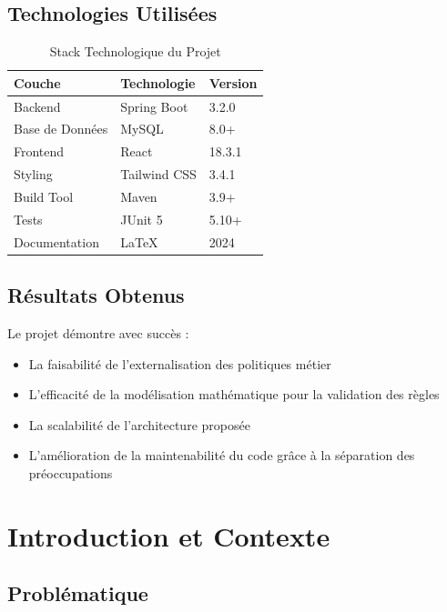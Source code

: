 \documentclass[12pt,a4paper]{article}
\begin{document}
    \subsection{Technologies Utilisées}

    \begin{table}[H]
        \centering
        \begin{tabular}{|l|l|l|}
            \hline
            \textbf{Couche} & \textbf{Technologie} & \textbf{Version} \\
            \hline
            Backend & Spring Boot & 3.2.0 \\
            Base de Données & MySQL & 8.0+ \\
            Frontend & React & 18.3.1 \\
            Styling & Tailwind CSS & 3.4.1 \\
            Build Tool & Maven & 3.9+ \\
            Tests & JUnit 5 & 5.10+ \\
            Documentation & LaTeX & 2024 \\
            \hline
        \end{tabular}
        \caption{Stack Technologique du Projet}
    \end{table}

    \subsection{Résultats Obtenus}

    Le projet démontre avec succès :
    \begin{itemize}
        \item La faisabilité de l'externalisation des politiques métier
        \item L'efficacité de la modélisation mathématique pour la validation des règles
        \item La scalabilité de l'architecture proposée
        \item L'amélioration de la maintenabilité du code grâce à la séparation des préoccupations
    \end{itemize}

    \newpage

    \section{Introduction et Contexte}

    \subsection{Problématique}
\end{document}
